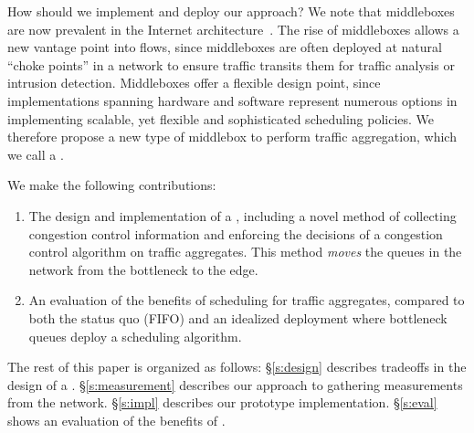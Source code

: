 {How should we implement and deploy our approach? 
We note that middleboxes are now prevalent in the Internet architecture~\cite{aplomb}.
The rise of middleboxes allows a new vantage point into flows, since middleboxes are often deployed at natural ``choke points''  in a network to ensure traffic transits them for \eg traffic analysis or intrusion detection.
Middleboxes offer a flexible design point, since implementations spanning hardware and software represent numerous options in implementing scalable, yet flexible and sophisticated scheduling policies.
We therefore propose a new type of middlebox to perform traffic aggregation, which we call a \name.

We make the following contributions:
\begin{enumerate}
    \item The design and implementation of a \name, including a novel method of collecting congestion control information and enforcing the decisions of a congestion control algorithm on traffic aggregates. This method \emph{moves} the queues in the network from the bottleneck to the edge.
    \item An evaluation of the benefits of scheduling for traffic aggregates, compared to both the status quo (FIFO) and an idealized deployment where bottleneck queues deploy a scheduling algorithm.
\end{enumerate}

The rest of this paper is organized as follows: 
\S\ref{s:design} describes tradeoffs in the design of a \name. 
\S\ref{s:measurement} describes our approach to gathering measurements from the network. 
\S\ref{s:impl} describes our prototype implementation. 
\S\ref{s:eval} shows an evaluation of the benefits of \name.

}

